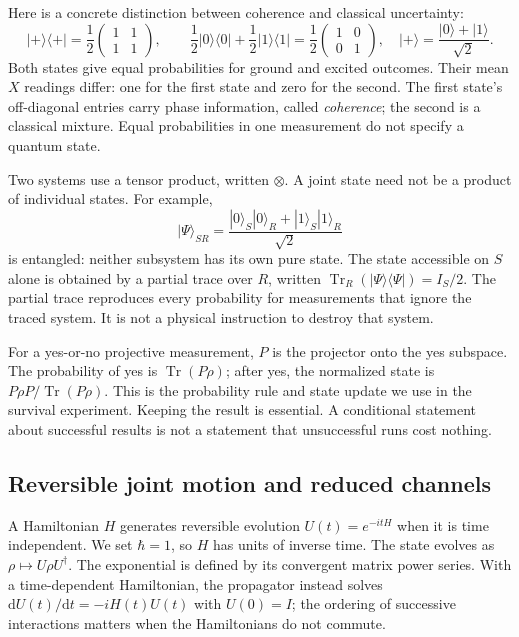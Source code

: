 \documentclass[11pt,a4paper]{article}
\numberwithin{equation}{section}
\theoremstyle{remark}
\newcommand{\dd}{\mathrm d}
\DeclareMathOperator{\Tr}{Tr}
\begin{document}
Here is a concrete distinction between coherence and classical uncertainty:
\begin{equation}
 |+\rangle\langle+|=\frac12\begin{pmatrix}1&1\\1&1\end{pmatrix},
 \qquad
 \frac12|0\rangle\langle0|+\frac12|1\rangle\langle1|
 =\frac12\begin{pmatrix}1&0\\0&1\end{pmatrix},
 \quad |+\rangle=\frac{|0\rangle+|1\rangle}{\sqrt2}.
\end{equation}
Both states give equal probabilities for ground and excited outcomes.
Their mean $X$ readings differ: one for the first state and zero for
the second. The first state's off-diagonal entries carry phase information,
called \emph{coherence}; the second is a classical mixture.
Equal probabilities in one measurement do not specify a quantum state.

Two systems use a tensor product, written $\otimes$. A joint state need not
be a product of individual states. For example,
\begin{equation}
 |\Psi\rangle_{SR}=\frac{|0\rangle_S|0\rangle_R+
 |1\rangle_S|1\rangle_R}{\sqrt2}
\end{equation}
is entangled: neither subsystem has its own pure state. The state accessible
on $S$ alone is obtained by a partial trace over $R$, written
$\Tr_R(|\Psi\rangle\langle\Psi|)=I_S/2$. The partial trace reproduces every probability for measurements that ignore
the traced system. It is not a physical instruction to destroy that system.

For a yes-or-no projective measurement, $P$ is the projector onto the yes
subspace. The probability of yes is $\Tr(P\rho)$; after yes, the normalized
state is $P\rho P/\Tr(P\rho)$. This is the probability rule and state update
we use in the survival experiment. Keeping the result is essential. A
conditional statement about successful results is not a statement that
unsuccessful runs cost nothing.

\subsection{Reversible joint motion and reduced channels}

A Hamiltonian $H$ generates reversible evolution
$U(t)=e^{-itH}$ when it is time independent. We set $\hbar=1$, so $H$ has
units of inverse time. The state evolves as $\rho\mapsto U\rho U^\dagger$.
The exponential is defined by its convergent matrix power series. With a
time-dependent Hamiltonian, the propagator instead solves
$\dd U(t)/\dd t=-iH(t)U(t)$ with $U(0)=I$; the ordering of successive
interactions matters when the Hamiltonians do not commute.
\end{document}
